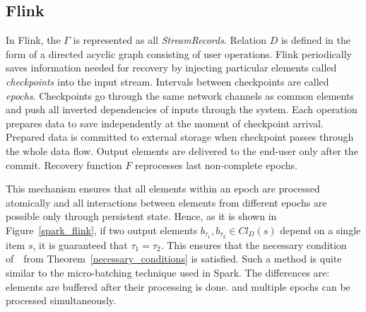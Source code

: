 
\subsection{Flink}

In Flink, the  $\Gamma$ is represented as all {\em StreamRecords}. Relation $D$ is defined in the form of a directed acyclic graph consisting of user operations. 
Flink periodically saves information needed for recovery by injecting particular elements called {\em checkpoints} into the input stream. 
Intervals  between checkpoints are called {\em epochs}. Checkpoints go through the same network channels as common elements and push all inverted dependencies of inputs through the system. 
Each operation prepares data to save independently at the moment of checkpoint arrival. Prepared data is committed to external storage when checkpoint passes through the whole data flow. Output elements are delivered to the end-user only after the commit. 
Recovery function $F$ reprocesses last non-complete epochs.

This mechanism ensures that all elements within an epoch are processed atomically and all interactions between elements from different epochs are possible only through persistent state. 
Hence, as it is shown in Figure~\ref{spark_flink},
 if two output elements $b_{\tau_1},b_{\tau_2} \in Cl_D(s)$ depend on a single item $s$, 
 it is guaranteed that $\tau_1=\tau_2$. 
This ensures that the necessary condition of~\eo\ from Theorem~\ref{necessary_conditions} is satisfied. 
Such a method is quite similar to the micro-batching technique used in Spark. 
The differences are: elements are buffered after their processing is done. and  multiple epochs can be processed simultaneously. 
